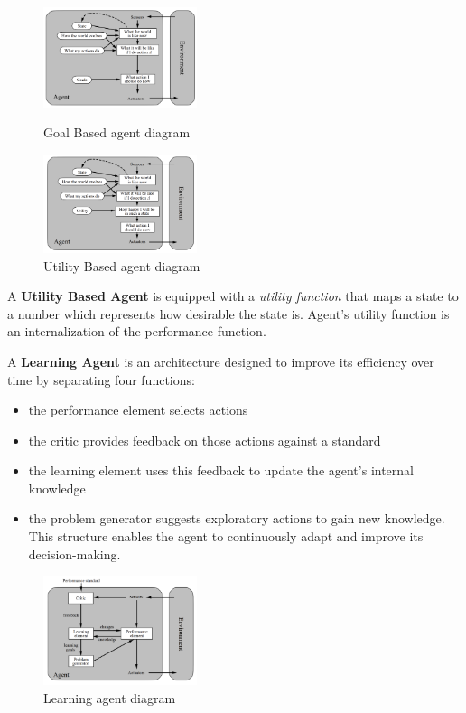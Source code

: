 \documentclass[10pt, letterpaper]{report}
\begin{document}
\begin{figure}[h!]
    \centering
    \includegraphics[width=0.4\textwidth ]{images/goal.png}
    \caption{Goal Based agent diagram}
    \label{img:goal_agent}
    \includegraphics[width=0.4\textwidth ]{images/utility.png}
    \caption{Utility Based agent diagram}
\end{figure}\bigskip

A \textbf{Utility Based Agent} is equipped with a \textit{utility function} that maps a state to a number which represents how
desirable the state is. Agent’s utility function is an internalization of the performance function.\bigskip

A \textbf{Learning Agent} is an architecture designed to improve its efficiency over time by separating four functions:\begin{itemize}
    \item  the performance element selects actions\item  
     the critic provides feedback on those actions against a standard\item   the learning element uses this feedback to update the agent's internal knowledge\item   the problem generator suggests exploratory actions to gain new knowledge. This structure enables the agent to continuously adapt and improve its decision-making.
\end{itemize}

\begin{figure}[h!]
    \centering
    \includegraphics[width=0.4\textwidth ]{images/learn_agent.png}
    \caption{Learning agent diagram}
\end{figure}\bigskip
\end{document}
